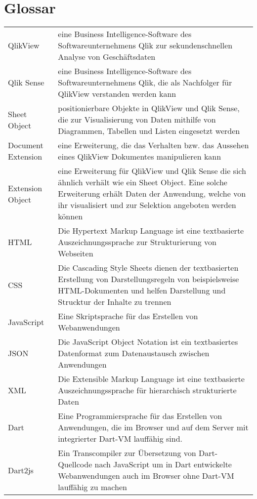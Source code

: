 \section*{Glossar}
\label{sec:Glossar}

\begin{tabularx}{\textwidth}{p{} X}
QlikView & eine Business Intelligence-Software des Softwareunternehmens Qlik zur sekundenschnellen Analyse von Geschäftsdaten \\
Qlik Sense & eine Business Intelligence-Software des Softwareunternehmens Qlik, die als Nachfolger für QlikView verstanden werden kann \\
Sheet Object & positionierbare Objekte in QlikView und Qlik Sense, die zur Visualisierung von Daten mithilfe von Diagrammen, Tabellen und Listen eingesetzt werden\\
Document Extension & eine Erweiterung, die das Verhalten bzw. das Aussehen eines QlikView Dokumentes manipulieren kann\\
Extension Object & eine Erweiterung für QlikView und Qlik Sense die sich ähnlich verhält wie ein Sheet Object. Eine solche Erweiterung erhält Daten der Anwendung, welche von ihr visualisiert und zur Selektion angeboten werden können\\
HTML & Die Hypertext Markup Language ist eine textbasierte Auszeich\-nungs\-sprache zur Strukturierung von Webseiten\\
CSS & Die Cascading Style Sheets dienen der textbasierten Erstellung von Darstellungsregeln von beispielsweise HTML-Dokumenten und helfen Darstellung und Strucktur der Inhalte zu trennen\\
JavaScript & Eine Skriptsprache für das Erstellen von Webanwendungen \\
JSON & Die JavaScript Object Notation ist ein textbasiertes Datenformat zum Datenaustausch zwischen Anwendungen \\
XML & Die Extensible Markup Language ist eine textbasierte Auszeich\-nungs\-sprache für hierarchisch strukturierte Daten\\
Dart & Eine Programmiersprache für das Erstellen von Anwendungen, die im Browser und auf dem Server mit integrierter Dart-VM lauffähig sind.  \\
Dart2js & Ein Transcompiler zur Übersetzung von Dart-Quellcode nach JavaScript um in Dart entwickelte Webanwendungen auch im Browser ohne Dart-VM lauffähig zu machen  \\
\end{tabularx}